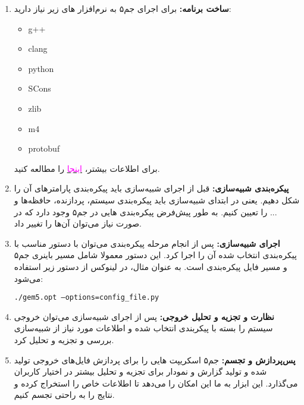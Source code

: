 \documentclass[12pt]{exam}
\begin{document}
\begin{multicols}{2}
\begin{enumerate}
		\item \textbf{ساخت برنامه: } برای اجرای جم۵ به نرم‌افزار های زیر نیاز دارید: 
		\begin{itemize}
			\item g++
			\item clang
			\item python
			\item SCons
			\item zlib
			\item m4
			\item protobuf
		\end{itemize}
		برای اطلاعات بیشتر، 
		\href{https://www.gem5.org/documentation/general_docs/building}{\textcolor{magenta}{اینجا}} را مطالعه کنید.
		
		\item \textbf{پیکره‌بندی شبیه‌سازی: }
		قبل از اجرای شبیه‌سازی باید پیکره‌بندی پارامتر‌های آن را شکل دهیم. یعنی در ابتدای شبیه‌سازی باید پیکره‌بندی سیستم، پردازنده، حافظه‌ها و ... را تعیین کنیم. به طور پیش‌فرض پیکره‌بندی هایی در جم۵ وجود دارد که در صورت نیاز می‌توان آن‌ها را تغییر داد.
		
		\item \textbf{اجرای شبیه‌سازی:‌ }
		پس از انجام مرحله پیکره‌بندی می‌توان با دستور مناسب با پیکره‌بندی انتخاب شده آن را اجرا کرد. این دستور معمولا شامل مسیر باینری جم۵ و مسیر فایل پیکره‌بندی است. به عنوان مثال، در لینوکس از دستور زیر استفاده می‌شود:
		
		\begin{latin}
			\texttt{./gem5.opt --options=config\_file.py}
		\end{latin}
		
		
		\item \textbf{نظارت و تجزیه و تحلیل خروجی: }
		پس از اجرای شبیه‌سازی می‌توان خروجی سیستم را بسته با پیکر‌بندی انتخاب شده و اطلاعات مورد نیاز از شبیه‌سازی بررسی و تجزیه و تحلیل کرد.
		
		\item \textbf{پس‌پردازش و تجسم: }جم۵ اسکریپت هایی را برای پردازش فایل‌های خروجی تولید شده و تولید گزارش و نمودار برای تجزیه و تحلیل بیشتر در اختیار کاربران می‌گذارد. این ابزار به ما این امکان را می‌دهد تا اطلاعات خاص را استخراج کرده و نتایج را به راحتی تجسم کنیم.
		
	\end{enumerate}
\end{multicols}
\end{document}
